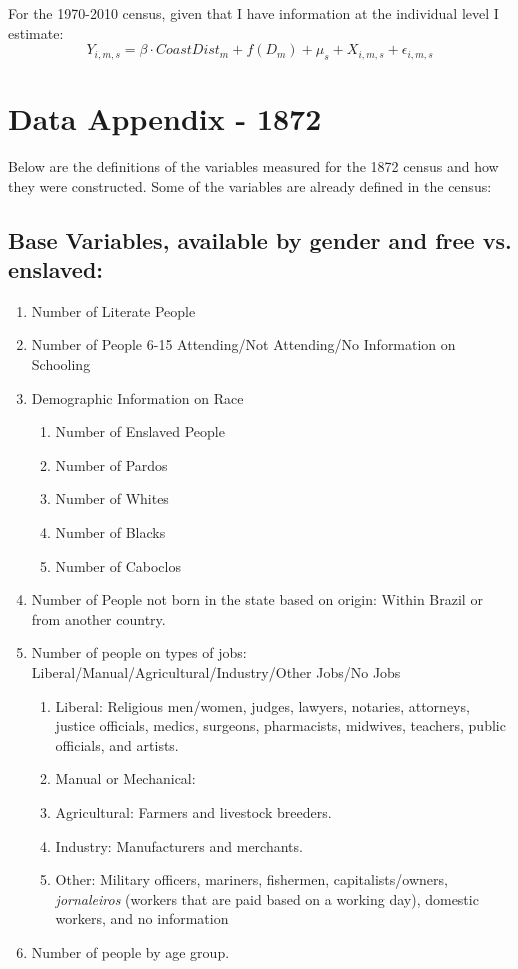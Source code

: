 \documentclass{article}
\begin{document}
For the 1970-2010 census, given that I have information at the individual level I estimate:
\begin{equation}
  Y_{i,m,s} = \beta \cdot CoastDist_{m} + f(D_{m})+ \mu_s + X_{i,m,s} + \epsilon_{i,m,s}
\end{equation}

\clearpage

\section{Data Appendix - 1872}
\label{app:variable_construction_1872}

Below are the definitions of the variables measured for the 1872 census and how they were constructed. Some of the variables are already defined in the census:

\subsection{Base Variables, available by gender and free vs. enslaved:}

\begin{enumerate}
  \item Number of Literate People
  \item Number of People 6-15 Attending/Not Attending/No Information on Schooling
  \item Demographic Information on Race
    \begin{enumerate}
      \item Number of Enslaved People
      \item Number of Pardos
      \item Number of Whites
      \item Number of Blacks
      \item Number of Caboclos
    \end{enumerate}
  \item Number of People not born in the state based on origin: Within Brazil or from another country.
  \item Number of people on types of jobs: Liberal/Manual/Agricultural/Industry/Other Jobs/No Jobs
    \begin{enumerate}
      \item Liberal: Religious men/women, judges, lawyers, notaries, attorneys, justice officials, medics, surgeons, pharmacists, midwives, teachers, public officials, and artists.
      \item Manual or Mechanical: 
      \item Agricultural: Farmers and livestock breeders.
      \item Industry: Manufacturers and merchants.
      \item Other: Military officers, mariners, fishermen, capitalists/owners, \textit{jornaleiros} (workers that are paid based on a working day), domestic workers, and no information
    \end{enumerate}
  \item Number of people by age group.
\end{enumerate}
\end{document}
